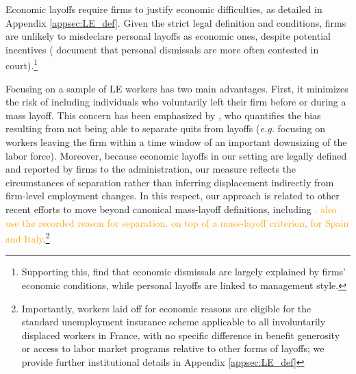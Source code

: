 Economic layoffs require firms to justify economic difficulties, as detailed in Appendix \ref{appsec:LE_def}. Given the strict legal definition and conditions, firms are unlikely to misdeclare personal layoffs as economic ones, despite potential incentives (\cite{fraisse2015labor} document that personal dismissals are more often contested in court).\footnote{Supporting this, \cite{signoretto2019individual} find that economic dismissals are largely explained by firms' economic conditions, while personal layoffs are linked to management style.}

Focusing on a sample of LE workers has two main advantages. First, it minimizes the risk of including individuals who voluntarily left their firm before or during a mass layoff. This concern has been emphasized by \cite{seim_2019}, who quantifies the bias resulting from not being able to separate quits from layoffs (\textit{e.g.} focusing on workers leaving the firm within a time window of an important downsizing of the labor force). Moreover, because economic layoffs in our setting are legally defined and reported by firms to the administration, our measure reflects the circumstances of separation rather than inferring displacement indirectly from firm-level employment changes. In this respect, our approach is related to other recent efforts to move beyond canonical mass-layoff definitions, including \cite{seim_2019,fackler2017explaining,cederlof_2024}\textcolor{orange}{. \citet{bertheau_etal_2023} also use the recorded reason for separation, on top of a mass-layoff criterion, for Spain and Italy}.\footnote{Importantly, workers laid off for economic reasons are eligible for the standard unemployment insurance scheme applicable to all involuntarily displaced workers in France, with no specific difference in benefit generosity or access to labor market programs relative to other forms of layoffs; we provide further institutional details in Appendix \ref{appsec:LE_def}}

